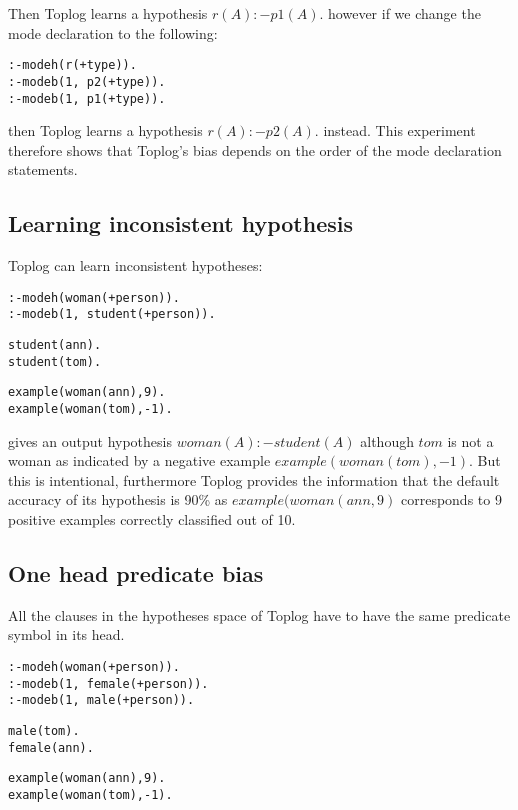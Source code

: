 Then Toplog learns a hypothesis $r(A) :- p1(A).$ however if we change the mode declaration to the following:
\begin{lstlisting}
:-modeh(r(+type)).
:-modeb(1, p2(+type)).
:-modeb(1, p1(+type)).
\end{lstlisting}
then Toplog learns a hypothesis $r(A) :- p2(A).$ instead. This experiment therefore shows that Toplog's bias depends on the order of the mode declaration statements.

\subsection{Learning inconsistent hypothesis}
Toplog can learn inconsistent hypotheses:

\begin{minipage}[t]{.40\textwidth}
\begin{lstlisting}
:-modeh(woman(+person)).
:-modeb(1, student(+person)).
\end{lstlisting}
\end{minipage}
\begin{minipage}[t]{.20\textwidth}
\begin{lstlisting}
student(ann).
student(tom).
\end{lstlisting}
\end{minipage}
\begin{minipage}[t]{.20\textwidth}
\begin{lstlisting}
example(woman(ann),9).
example(woman(tom),-1).
\end{lstlisting}
\end{minipage}


gives an output hypothesis $woman(A) :- student(A)$ although $tom$ is not a woman as indicated by a negative example $example(woman(tom),-1)$.
But this is intentional, furthermore Toplog provides the information that the default accuracy of its hypothesis is 90\% as $example(woman(ann,9)$ corresponds to 9 positive examples correctly classified out of 10.

\subsection{One head predicate bias}
All the clauses in the hypotheses space of Toplog have to have the same predicate symbol in its head.

\begin{minipage}[t]{.40\textwidth}
\begin{lstlisting}
:-modeh(woman(+person)).
:-modeb(1, female(+person)).
:-modeb(1, male(+person)).
\end{lstlisting}
\end{minipage}
\begin{minipage}[t]{.20\textwidth}
\begin{lstlisting}
male(tom).
female(ann).
\end{lstlisting}
\end{minipage}
\begin{minipage}[t]{.20\textwidth}
\begin{lstlisting}
example(woman(ann),9).
example(woman(tom),-1).
\end{lstlisting}
\end{minipage}


